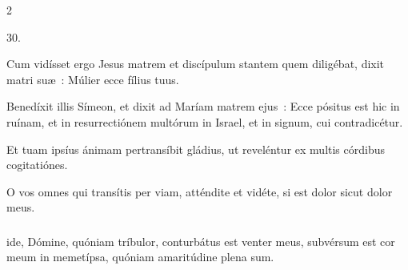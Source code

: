 \documentclass[9pt,twoside]{extarticle}
\begin{document}
\begin{multicols}{2}
{\begin{tightlist}{}
\item {} 30.
\item {} Cum vidísset ergo Jesus matrem et discípulum stantem quem diligébat, dixit matri suæ~: Múlier ecce fílius tuus.
\item {} Benedíxit illis Símeon, et dixit ad Maríam matrem ejus~: Ecce pósitus est hic in ruínam, et in resurrectiónem multórum in Israel, et in signum, cui contradicétur.
\item {} Et tuam ipsíus ánimam pertransíbit gládius, ut reveléntur ex multis córdibus cogitatiónes.
\item {} O vos omnes qui transítis per viam, atténdite et vidéte, si est dolor sicut dolor meus.
\end{tightlist}

\subsubsection*{}
ide, Dómine, quóniam tríbulor, conturbátus est venter meus, subvérsum est cor meum in memetípsa, quóniam amaritúdine plena sum.

}
\end{multicols}
\end{document}

